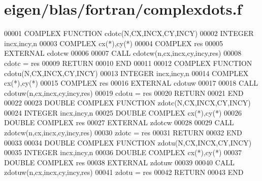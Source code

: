 \hypertarget{eigen_2blas_2fortran_2complexdots_8f_source}{}\section{eigen/blas/fortran/complexdots.f}
\label{eigen_2blas_2fortran_2complexdots_8f_source}

\begin{DoxyCode}
00001 \textcolor{keyword}{      COMPLEX }\textcolor{keyword}{FUNCTION }cdotc(N,CX,INCX,CY,INCY)
00002       \textcolor{keywordtype}{INTEGER} incx,incy,n
00003       \textcolor{keywordtype}{COMPLEX} cx(*),cy(*)
00004       \textcolor{keywordtype}{COMPLEX} res
00005       \textcolor{keywordtype}{EXTERNAL} cdotcw
00006       
00007       \textcolor{keyword}{CALL }cdotcw(n,cx,incx,cy,incy,res)
00008       cdotc = res
00009       \textcolor{keywordflow}{RETURN}
00010 \textcolor{keyword}{      END}
00011       
00012 \textcolor{keyword}{      COMPLEX }\textcolor{keyword}{FUNCTION }cdotu(N,CX,INCX,CY,INCY)
00013       \textcolor{keywordtype}{INTEGER} incx,incy,n
00014       \textcolor{keywordtype}{COMPLEX} cx(*),cy(*)
00015       \textcolor{keywordtype}{COMPLEX} res
00016       \textcolor{keywordtype}{EXTERNAL} cdotuw
00017       
00018       \textcolor{keyword}{CALL }cdotuw(n,cx,incx,cy,incy,res)
00019       cdotu = res
00020       \textcolor{keywordflow}{RETURN}
00021 \textcolor{keyword}{      END}
00022       
00023 \textcolor{keyword}{      DOUBLE COMPLEX }\textcolor{keyword}{FUNCTION }zdotc(N,CX,INCX,CY,INCY)
00024       \textcolor{keywordtype}{INTEGER} incx,incy,n
00025       \textcolor{keywordtype}{DOUBLE COMPLEX} cx(*),cy(*)
00026       \textcolor{keywordtype}{DOUBLE COMPLEX} res
00027       \textcolor{keywordtype}{EXTERNAL} zdotcw
00028       
00029       \textcolor{keyword}{CALL }zdotcw(n,cx,incx,cy,incy,res)
00030       zdotc = res
00031       \textcolor{keywordflow}{RETURN}
00032 \textcolor{keyword}{      END}
00033       
00034 \textcolor{keyword}{      DOUBLE COMPLEX }\textcolor{keyword}{FUNCTION }zdotu(N,CX,INCX,CY,INCY)
00035       \textcolor{keywordtype}{INTEGER} incx,incy,n
00036       \textcolor{keywordtype}{DOUBLE COMPLEX} cx(*),cy(*)
00037       \textcolor{keywordtype}{DOUBLE COMPLEX} res
00038       \textcolor{keywordtype}{EXTERNAL} zdotuw
00039       
00040       \textcolor{keyword}{CALL }zdotuw(n,cx,incx,cy,incy,res)
00041       zdotu = res
00042       \textcolor{keywordflow}{RETURN}
00043 \textcolor{keyword}{      END}
\end{DoxyCode}
